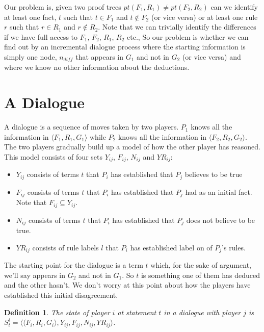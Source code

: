 \documentclass{blue-book}
\newtheorem{definition}{Definition}
\newcommand{\pt}[2]{\ensuremath{pt(#1,#2)}}
\begin{document}
Our problem is, given two proof trees $\pt{F_1}{R_1} \neq \pt{F_2}{R_2}$ can we identify at least one fact, $t$ such that $t \in F_1$ and $t \not\in F_2$ (or vice versa) or at least one rule $r$ such that $r \in R_1$ and $r\not\in R_2$.  Note that we can trivially identify the differences if we have full access to $F_1$, $F_2$, $R_1$, $R_2$ etc., So our problem is whether we can find out by an incremental dialogue process where the starting information is simply one node, $n_{\mathit{diff}}$ that appears in $G_1$ and not in $G_2$ (or vice versa) and where we know no other information about the deductions.


\section{A Dialogue}

A dialogue is a sequence of moves taken by two players.  $P_1$ knows all the information in $\langle F_1, R_1, G_1\rangle$ while $P_2$ knows all the information in $\langle F_2, R_2, G_2\rangle$.  The two players gradually build up a model of how the other player has reasoned.  This model consists of four sets $Y_{ij}$, $F_{ij}$, $N_{ij}$ and $YR_{ij}$:
\begin{itemize}
\item $Y_{ij}$ consists of terms $t$ that $P_i$ has established that $P_j$ believes to be true
\item $F_{ij}$ consists of terms $t$ that $P_i$ has established that $P_j$ had as an initial fact.  Note that $F_{ij} 
\subseteq Y_{ij}$.
\item$N_{ij}$ consists of terms $t$ that $P_i$ has established that $P_j$ does not believe to be true.
\item $YR_{ij}$ consists of rule labels $l$ that $P_i$ has established label on of $P_j$'s rules. 
\end{itemize}


The starting point for the dialogue is a term $t$ which, for the sake of argument, we'll say appears in $G_2$ and not in $G_1$.  So $t$ is something one of them has deduced and the other hasn't.  We don't worry at this point about how the players have established this initial disagreement.

\begin{definition}
The state of player $i$ at statement $t$ in a dialogue with player $j$ is $S^i_t = \langle \langle F_i, R_i, G_i \rangle, Y_{ij}, F_{ij}, N_{ij}, YR_{ij} \rangle$.  
\end{definition}
\end{document}
